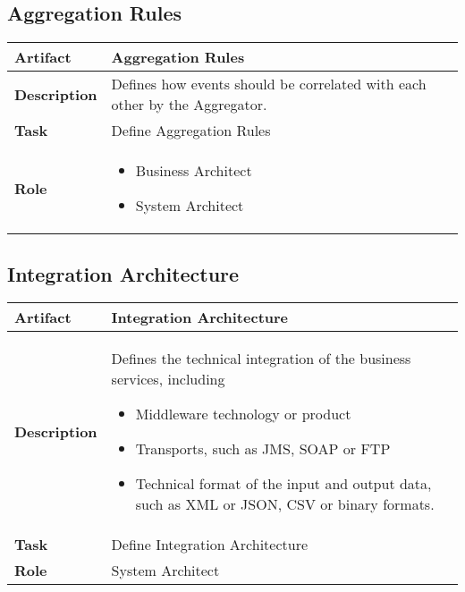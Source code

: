 \subsection{Aggregation Rules}

\begin{tabularx}{\textwidth}{@{} l X @{}}
	\caption{Aggregation Rules} \label{table:ch6_Artifact_Aggregation_Rules}\\
	\toprule 
	\bfseries Artifact & Aggregation Rules\\
	\midrule 
	\bfseries Description & Defines how events should be correlated with each other by the Aggregator.\\
	\midrule 
	\bfseries Task & Define Aggregation Rules
		\\
	\midrule 
	\bfseries Role & 
	\begin{itemize}
		\item Business Architect
		\item System Architect
	\end{itemize}
	\\
	\bottomrule 
\end{tabularx}


\subsection{Integration Architecture}

\begin{tabularx}{\textwidth}{@{} l X @{}}
	\caption{Integration Architecture} \label{table:ch6_Artifact_Integration_Architecture}\\
	\toprule 
	\bfseries Artifact & Integration Architecture\\
	\midrule 
	\bfseries Description & Defines the technical integration of the business services, including
	\begin{itemize}
		\item Middleware technology or product
		\item Transports, such as \ac{JMS}, \ac{SOAP} or \ac{FTP}
		\item Technical format of the input and output data, such as \ac{XML} or \ac{JSON}, \ac{CSV} or binary formats.
	\end{itemize}
	\\
	\midrule 
	\bfseries Task & Define Integration Architecture 
		\\
	\midrule 
	\bfseries Role & System Architect\\
	\bottomrule 
\end{tabularx}


